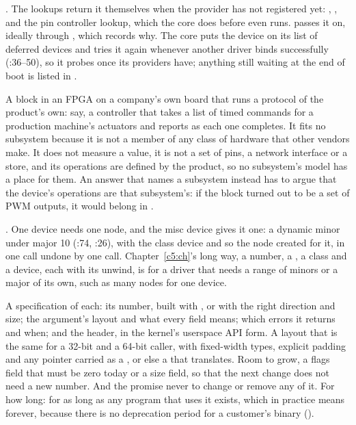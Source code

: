  . The lookups return it themselves when the provider has not
registered yet: , , and the pin controller lookup,
which the core does before  even runs.  passes it on, ideally through
, which records why. The core puts the device on its list of deferred devices
and tries it again whenever another driver binds successfully (:36--50), so
it probes once its providers have; anything still waiting at the end of boot is listed in
.


 A block in an FPGA on a company's own board that runs a protocol of the product's own:
say, a controller that takes a list of timed commands for a production machine's actuators and
reports as each one completes. It fits no subsystem because it is not a member of any class of
hardware that other vendors make. It does not measure a value, it is not a set of pins, a network
interface or a store, and its operations are defined by the product, so no subsystem's model has a
place for them. An answer that names a subsystem instead has to argue that the device's operations
are that subsystem's: if the block turned out to be a set of PWM outputs, it would belong in
.

 . One device needs one node, and the misc device gives it one: a
dynamic minor under major 10 (:74,
:26), with the class device and so the node created for it, in one
call undone by one call. Chapter~\ref{c5:ch}'s long way, a number, a , a class and a
device, each with its unwind, is for a driver that needs a range of minors or a major of its own,
such as many nodes for one device.

 A specification of each: its number, built with ,  or 
with the right direction and size; the argument's layout and what every field means; which errors
it returns and when; and the header, in the kernel's userspace API form. A layout that is the same
for a 32-bit and a 64-bit caller, with fixed-width types, explicit padding and any pointer carried
as a , or else a  that translates. Room to grow, a flags field that
must be zero today or a size field, so that the next change does not need a new number. And the
promise never to change or remove any of it. For how long: for as long as any program that uses it
exists, which in practice means forever, because there is no deprecation period for a customer's
binary ().

